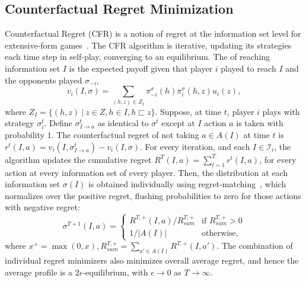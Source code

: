 \documentclass[letterpaper]{article}
\newcommand{\cI}{\mathcal{I}}
\newcommand{\defword}[1]{\textbf{\boldmath{#1}}}
\begin{document}
\subsection{Counterfactual Regret Minimization}

Counterfactual Regret (CFR) is a notion of regret at the information set level for extensive-form games~\cite{CFR}. 
The CFR algorithm is iterative, updating its strategies each time step in self-play, converging to an equilibrium. 
The \defword{counterfactual value} of reaching information set $I$ is the expected payoff given that player $i$ played to reach $I$ and the opponents played 
$\sigma_{-i}$, 
\begin{equation}
\label{eq:cfv}
v_i(I,\sigma) = \sum_{(h,z) \in Z_I} \pi^{\sigma}_{-i}(h) \pi^{\sigma}_{i}(h,z) u_i(z), 
\end{equation}
where $Z_I = \{ (h,z)~|~z \in Z, h \in I, h \sqsubset z \}$.
Suppose, at time $t$, player $i$ plays with strategy $\sigma^t_i$. 
Define $\sigma^t_{I \rightarrow a}$ as identical to $\sigma^t$ except at $I$ action $a$ is taken with probability $1$. 
The counterfactual regret of not taking $a \in A(I)$ at time $t$ is $r^t(I,a) = v_i(I,\sigma^t_{I \rightarrow a}) - v_i(I,\sigma)$. 
For every iteration, and each $I \in \cI_i$, the algorithm updates the cumulative regret $R^T(I,a) = \sum_{t=1}^T r^t(I,a)$, for every
action at every information set of every player. 
Then, the distribution at each information set $\sigma(I)$ is obtained individually using 
regret-matching~\cite{Hart00}, which normalizes over the 
positive regret, flushing probabilities to zero for those actions with negative regret:
\begin{equation}
\label{eq:rm}
\sigma^{T+1}(I,a) = \left\{
\begin{array}{ll}
R^{T,+}(I,a) / R^{T,+}_{sum} & \mbox{if } R^{T,+}_{sum} > 0 \\ 
1 / |A(I)|                   & \mbox{otherwise,}
\end{array} \right.
\end{equation}
where $x^+ = \max(0,x), R^{T,+}_{sum} = \sum_{a' \in A(I)} R^{T,+}(I,a')$. 
The combination of individual regret minimizers
also minimizes overall average regret, and hence the average profile is a $2\epsilon$-equilibrium, with $\epsilon \rightarrow 0$
as $T \rightarrow \infty$.
\end{document}
